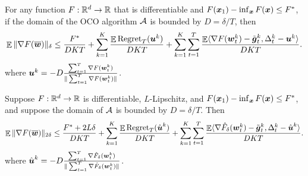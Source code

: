 \begin{lemma}
\label{lem:DP-O2NC:O2NC-base}
For any function $F:\mathbb R^d\to\mathbb R$ that is differentiable and $F({\boldsymbol{x}}_1)-\inf_{{\boldsymbol{x}}} F({\boldsymbol{x}}) \le F^*$, if the domain of the OCO algorithm ${\cal A}$ is bounded by $D=\delta/T$, then 
\begin{equation*}
    \mathop{\mathbb{E}}\|\nabla F(\overline{{\boldsymbol{w}}})\|_\delta 
    \le \frac{F^*}{DKT} + \sum_{k=1}^K \frac{\mathop{\mathbb{E}}\mathrm{Regret}_T({\boldsymbol{u}}^k)}{DKT} + \sum_{k=1}^K\sum_{t=1}^T \frac{ \mathop{\mathbb{E}}\langle \nabla F({\boldsymbol{w}}_t^k) - \tilde{{\boldsymbol{g}}}_t^k, \Delta_t^k - {\boldsymbol{u}}^k \rangle }{DKT}.
\end{equation*}
where ${\boldsymbol{u}}^k = -D\frac{\sum_{t=1}^T \nabla F({\boldsymbol{w}}_t^k)}{\|\sum_{t=1}^T \nabla F({\boldsymbol{w}}_t^k)\|}$.
\end{lemma}

\begin{lemma}
\label{cor:DP-O2NC:O2NC-smoothing}
Suppose $F:\mathbb R^d\to\mathbb R$ is differentiable, $L$-Lipschitz, and $F({\boldsymbol{x}}_1)-\inf_{\boldsymbol{x}} F({\boldsymbol{x}})\le F^*$, and suppose the domain of ${\cal A}$ is bounded by $D=\delta/T$. Then
\begin{equation*}
    \mathop{\mathbb{E}}\|\nabla F(\overline {{\boldsymbol{w}}})\|_{2\delta} \le \frac{F^*+2L\delta}{DKT} + \sum_{k=1}^K\frac{\mathop{\mathbb{E}}\mathrm{Regret}_T(\hat{{\boldsymbol{u}}}^k)}{DKT} + \sum_{k=1}^K\sum_{t=1}^T \frac{ \mathop{\mathbb{E}}\langle \nabla\hat F_\delta({\boldsymbol{w}}_t^k)-\tilde{{\boldsymbol{g}}}_t^k, \Delta_t^k-\hat{{\boldsymbol{u}}}^k\rangle }{DKT}.
\end{equation*}
where $\hat{{\boldsymbol{u}}}^k = -D\frac{\sum_{t=1}^T\nabla\hat F_\delta({\boldsymbol{w}}_t^k)}{\|\sum_{t=1}^T\nabla\hat F_\delta({\boldsymbol{w}}_t^k)\|}$.
\end{lemma}


